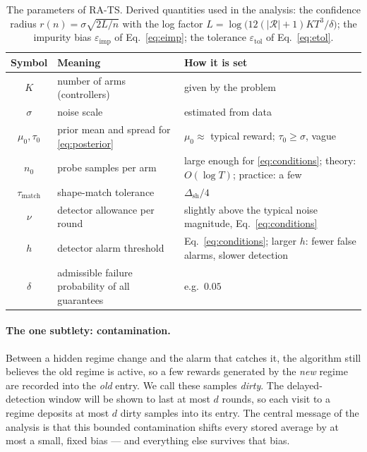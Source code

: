 \documentclass[11pt]{article}
\newcommand{\Rcal}{\mathcal R}
\newcommand{\eimp}{\varepsilon_{\mathrm{imp}}}
\newcommand{\etol}{\varepsilon_{\mathrm{tol}}}
\newcommand{\dsh}{\Delta_{\mathrm{sh}}}
\newcommand{\taum}{\tau_{\mathrm{match}}}
\begin{document}
\begin{table}[t]
\centering\small
\renewcommand{\arraystretch}{1.3}
\begin{tabularx}{\textwidth}{@{}c >{\raggedright\arraybackslash}X >{\raggedright\arraybackslash}p{}@{}}
\toprule
\textbf{Symbol} & \textbf{Meaning} & \textbf{How it is set} \\
\midrule
$K$ & number of arms (controllers) & given by the problem \\
$\sigma$ & noise scale & estimated from data \\
$\mu_0,\tau_0$ & prior mean and spread for \eqref{eq:posterior} & $\mu_0\approx$ typical reward; $\tau_0\ge\sigma$, vague \\
$n_0$ & probe samples per arm & large enough for \eqref{eq:conditions}; theory: $O(\log T)$; practice: a few \\
$\taum$ & shape-match tolerance & $\dsh/4$ \\
$\nu$ & detector allowance per round & slightly above the typical noise magnitude, Eq.~\eqref{eq:conditions} \\
$h$ & detector alarm threshold & Eq.~\eqref{eq:conditions}; larger $h$: fewer false alarms, slower detection \\
$\delta$ & admissible failure probability of all guarantees & e.g.\ $0.05$ \\
\bottomrule
\end{tabularx}
\caption{The parameters of RA-TS. Derived quantities used in the analysis: the confidence radius $r(n)=\sigma\sqrt{2L/n}$ with the log factor $L=\log\bigl(12(|\Rcal|{+}1)KT^3/\delta\bigr)$; the impurity bias $\eimp$ of Eq.~\eqref{eq:eimp}; the tolerance $\etol$ of Eq.~\eqref{eq:etol}.}
\label{tab:params}
\end{table}

\paragraph{The one subtlety: contamination.}
Between a hidden regime change and the alarm that catches it, the algorithm still believes the old regime is active, so a few rewards generated by the \emph{new} regime are recorded into the \emph{old} entry. We call these samples \emph{dirty}. The delayed-detection window will be shown to last at most $d$ rounds, so each visit to a regime deposits at most $d$ dirty samples into its entry. The central message of the analysis is that this bounded contamination shifts every stored average by at most a small, fixed bias --- and everything else survives that bias.
\end{document}
